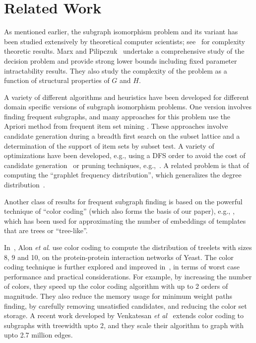 \section{Related Work}
\label{sec:related-work}

As mentioned earlier, the subgraph isomorphism problem and its variant has been
studied extensively by theoretical computer scientists;
see~\cite{valiant1979complexity,hunt1998complexity,fomin2012faster,flum2004parameterized,curticapean2014complexity,marx2014everything}
for complexity theoretic results.  Marx and Pilipczuk~\cite{marx2014everything}
undertake  a comprehensive study of the decision problem and provide strong
lower bounds including fixed parameter intractability results. They also study
the complexity of the problem as a function of structural properties of $G$ and
$H$.

A variety of different algorithms and heuristics have been developed for
different domain specific versions of subgraph isomorphism problems.  One
version involves finding frequent subgraphs, and many approaches for this
problem use the Apriori method from frequent item set mining
\cite{inokuchi2000apriori, kuramochi2005finding, getoor2005link}. These
approaches involve candidate generation during a breadth first search on the
subset lattice and a determination of the support of item sets by subset test. A
variety of optimizations have been developed, e.g., using a DFS order to avoid
the cost of candidate generation~\cite{huan2004spin, yan2005mining} or pruning
techniques, e.g.,~\cite{kuramochi2005finding}.  A related problem is that of
computing the ``graphlet frequency distribution'', which generalizes the degree
distribution~\cite{przulj2007biological}.

Another class of results for frequent subgraph finding is based on the powerful
technique of ``color coding'' (which also forms the basis of our paper), e.g.,
\cite{alon2008biomolecular, huffner2008algorithm, zhao2010subgraph}, which has
been used for approximating the number of embeddings of templates that are
trees or ``tree-like''.

In~\cite{alon2008biomolecular}, Alon \emph{et al}. use color coding to compute
the distribution of treelets with sizes 8, 9 and 10, on the protein-protein
interaction networks of Yeast. The color coding technique is further explored
and improved in~\cite{huffner2008algorithm}, in terms of worst case performance
and practical considerations. For example, by increasing the number of colors,
they speed up the color coding algorithm with up to 2 orders of magnitude. They
also reduce the memory usage for minimum weight paths finding, by carefully
removing unsatisfied candidates, and reducing the color set storage. A recent
work developed by Venkatesan \emph{et al}~\cite{chakaravarthy2016subgraph}
extends color coding to subgraphs with treewidth upto 2, and they scale their
algorithm to graph with upto 2.7 million edges.

